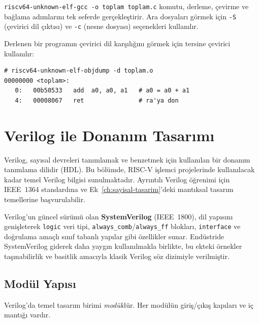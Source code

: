 \begin{bilginot}
\texttt{riscv64-unknown-elf-gcc -o toplam toplam.c} komutu, derleme, çevirme ve bağlama adımlarını tek seferde gerçekleştirir. Ara dosyaları görmek için \texttt{-S} (çevirici dil çıktısı) ve \texttt{-c} (nesne dosyası) seçenekleri kullanılır.
\end{bilginot}

Derlenen bir programın çevirici dil karşılığını görmek için tersine çevirici kullanılır:

\begin{lstlisting}[style=riscv, caption={Tersine çevirici çıktısı örneği}, label={lst:ekd-objdump}]
# riscv64-unknown-elf-objdump -d toplam.o
00000000 <toplam>:
   0:   00b50533   add  a0, a0, a1   # a0 = a0 + a1
   4:   00008067   ret               # ra'ya don
\end{lstlisting}


\section{Verilog ile Donanım Tasarımı}
\label{sec:ekd-verilog}

Verilog, sayısal devreleri tanımlamak ve benzetmek için kullanılan bir donanım tanımlama dilidir (HDL). Bu bölümde, RISC-V işlemci projelerinde kullanılacak kadar temel Verilog bilgisi sunulmaktadır. Ayrıntılı Verilog öğrenimi için IEEE~1364 standardına ve Ek~\ref{ch:sayisal-tasarim}'deki mantıksal tasarım temellerine başvurulabilir.

Verilog'un güncel sürümü olan \textbf{SystemVerilog} (IEEE~1800), dil yapısını genişleterek \texttt{logic} veri tipi, \texttt{always\_comb}/\texttt{always\_ff} blokları, \texttt{interface} ve doğrulama amaçlı sınıf tabanlı yapılar gibi özellikler sunar. Endüstride SystemVerilog giderek daha yaygın kullanılmakla birlikte, bu ekteki örnekler taşınabilirlik ve basitlik amacıyla klasik Verilog söz dizimiyle verilmiştir.

\subsection{Modül Yapısı}
\label{sec:ekd-modul}

Verilog'da temel tasarım birimi \emph{modül}dür. Her modülün giriş/çıkış kapıları ve iç mantığı vardır.

